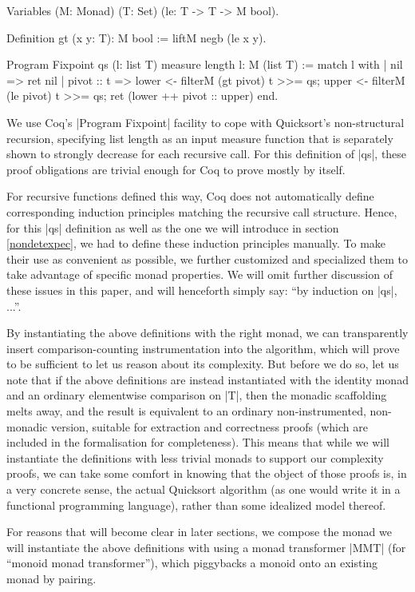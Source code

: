 \documentclass[runningheads]{llncs}
\begin{document}
\begin{code}
  Variables (M: Monad) (T: Set) (le: T -> T -> M bool).

  Definition gt (x y: T): M bool := liftM negb (le x y).

  Program Fixpoint qs (l: list T) {measure length l}: M (list T) :=
    match l with
    | nil => ret nil
    | pivot :: t =>
        lower <- filterM (gt pivot) t >>= qs;
        upper <- filterM (le pivot) t >>= qs;
        ret (lower ++ pivot :: upper)
    end.
\end{code}

We use Coq's |Program Fixpoint| facility \cite{subsetcoercions} to cope with Quicksort's non-structural recursion, specifying list length as an input measure function that is separately shown to strongly decrease for each recursive call. For this definition of |qs|, these proof obligations are trivial enough for Coq to prove mostly by itself.

For recursive functions defined this way, Coq does not automatically define corresponding induction principles matching the recursive call structure. Hence, for this |qs| definition as well as the one we will introduce in section \ref{nondetexpec}, we had to define these induction principles manually. To make their use as convenient as possible, we further customized and specialized them to take advantage of specific monad properties. We will omit further discussion of these issues in this paper, and will henceforth simply say: ``by induction on |qs|, ...''.

By instantiating the above definitions with the right monad, we can transparently insert comparison-counting instrumentation into the algorithm, which will prove to be sufficient to let us reason about its complexity. But before we do so, let us note that if the above definitions are instead instantiated with the identity monad and an ordinary elementwise comparison on |T|, then the monadic scaffolding melts away, and the result is equivalent to an ordinary non-instrumented, non-monadic version, suitable for extraction and correctness proofs (which are included in the formalisation for completeness). This means that while we will instantiate the definitions with less trivial monads to support our complexity proofs, we can take some comfort in knowing that the object of those proofs is, in a very concrete sense, the actual Quicksort algorithm (as one would write it in a functional programming language), rather than some idealized model thereof.

For reasons that will become clear in later sections, we compose the monad we will instantiate the above definitions with using a monad transformer \cite{monadtrans} |MMT| (for ``monoid monad transformer''), which piggybacks a monoid onto an existing monad by pairing.
\end{document}
